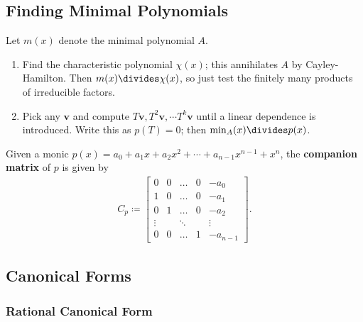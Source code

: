 \hypertarget{finding-minimal-polynomials}{%
\subsection{Finding Minimal
Polynomials}\label{finding-minimal-polynomials}}

Let \(m(x)\) denote the minimal polynomial \(A\).

\begin{enumerate}
\def\labelenumi{\arabic{enumi}.}
\item
  Find the characteristic polynomial \(\chi(x)\); this annihilates \(A\)
  by Cayley-Hamilton. Then \(m(x) \divides \chi(x)\), so just test the
  finitely many products of irreducible factors.
\item
  Pick any \(\mathbf{v}\) and compute
  \(T\mathbf{v}, T^2\mathbf{v}, \cdots T^k\mathbf{v}\) until a linear
  dependence is introduced. Write this as \(p(T) = 0\); then
  \(\min_A(x) \divides p(x)\).
\end{enumerate}

\begin{description}
\tightlist
\item[Definition (Companion Matrix)]
Given a monic
\(p(x) = a_0 + a_1 x + a_2 x^2 + \cdots + a_{n-1} x^{n-1} + x^n\), the
\textbf{companion matrix} of \(p\) is given by
\begin{align*} C_p \coloneqq \begin{bmatrix} 0 & 0 & \dots & 0 &-a_0 \\  1 & 0 & \dots & 0 & -a_1 \\  0 & 1 & \dots & 0 & -a_2 \\  \vdots & & \ddots & & \vdots \\  0 & 0 & \dots & 1 & -a_{n-1}  \end{bmatrix} .\end{align*}
\end{description}

\hypertarget{canonical-forms}{%
\subsection{Canonical Forms}\label{canonical-forms}}

\hypertarget{rational-canonical-form}{%
\subsubsection{Rational Canonical Form}\label{rational-canonical-form}}

